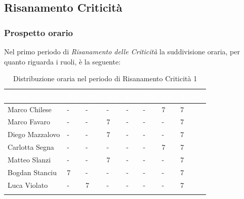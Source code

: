 \subsection{Risanamento Criticità}
\label{PRC1}
\subsubsection{Prospetto orario}

Nel primo periodo di \textit{Risanamento delle Criticità} la suddivisione oraria, per quanto riguarda i ruoli, è la seguente:

\begin{longtable}{|C{.30\textwidth}|C{.06\textwidth}|C{.06\textwidth}|C{.06\textwidth} | C{.06\textwidth}| C{.06\textwidth} | C{.06\textwidth} | C{.10\textwidth} |}
\hline
{}	\textbf{\textcolor{white}{Nome}} & \textbf{\textcolor{white}{RE}} & \textbf{\textcolor{white}{AM}} & \textbf{\textcolor{white}{AN}} & \textbf{\textcolor{white}{PJ}} & \textbf{\textcolor{white}{PR}} & \textbf{\textcolor{white}{VE}} & \textbf{\textcolor{white}{Totale}}\\
\hline 
Marco Chilese & - & - & - & - & - & 7 & 7 \\
\hline
{}Marco Favaro & - & - & 7 & - & - & - & 7 \\
\hline
Diego Mazzalovo & - & - & 7 & - & - & - & 7 \\
\hline
{}Carlotta Segna & - & - & - & - & - & 7 & 7 \\
\hline
Matteo Slanzi & - & - & 7 & - & - & - & 7 \\
\hline
{}Bogdan Stanciu & 7 & - & - & - & - & - & 7 \\
\hline
Luca Violato & - & 7 & - & - & - & - & 7 \\
\hline

\caption{Distribuzione oraria nel periodo di Risanamento Criticità 1}
\label{Distribuzione oraria del periodo di rc1}
\end{longtable}



